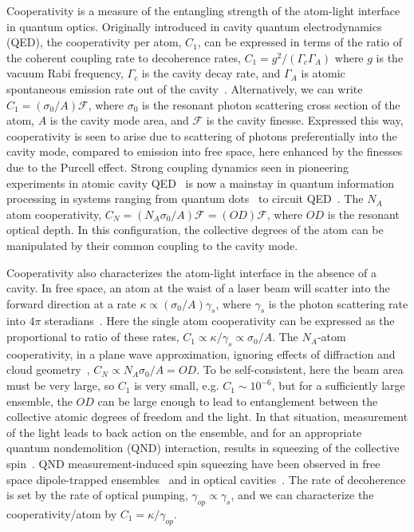 \documentclass[preprint,aps,pra,onecolumn,superscriptaddress]{revtex4-1} %
\begin{document}
Cooperativity is a measure of the entangling strength of the atom-light interface in quantum optics.  Originally introduced in cavity quantum electrodynamics (QED), the cooperativity per atom, $C_1$, can be expressed in terms of the ratio of the coherent coupling rate to decoherence rates, $C_1 = g^2/(\Gamma_c \Gamma_A)$ where $g$ is the vacuum Rabi frequency,  $\Gamma_c$ is the cavity decay rate, and $\Gamma_A$ is atomic spontaneous emission rate out of the cavity~\cite{Kimble1998}.  Alternatively, we can write $C_1 = (\sigma_0/A) \mathcal{F}$, where $\sigma_0$ is the resonant photon scattering cross section of the atom, $A$ is the cavity mode area, and $\mathcal{F}$ is the cavity finesse.  Expressed this way, cooperativity is seen to arise due to scattering of photons preferentially into the cavity mode, compared to emission into free space, here enhanced by the finesses due to the Purcell effect. Strong coupling dynamics seen in pioneering experiments in atomic cavity QED~\cite{Raimond2001Manipulating, Miller2005} is now a mainstay in quantum information processing in systems ranging from quantum dots~\cite{Akimov2007, Akopian2006, Liu2010} to circuit QED~\cite{Wallraff2004Strong, Hofheinz2009Synthesizing}.  The $N_A$ atom cooperativity, $C_N = (N_A \sigma_0/A) \mathcal{F} =( OD) \mathcal{F}$, where $OD$ is the resonant optical depth.  In this configuration, the collective degrees of the atom can be manipulated by their common coupling to the cavity mode.

Cooperativity also characterizes the atom-light interface in the absence of a cavity.  In free space, an atom at the waist of a laser beam will scatter into the forward direction at a rate $\kappa \propto (\sigma_0/A) \gamma_s$, where $\gamma_s$ is the photon scattering rate into $4 \pi$ steradians~\cite{Baragiola2014}.  Here the single atom cooperativity can be expressed as the proportional to ratio of these rates, $C_1 \propto \kappa/\gamma_s \propto \sigma_0/A$.  The $N_A$-atom cooperativity, in a plane wave approximation, ignoring effects of diffraction and cloud geometry~\cite{Baragiola2014}, $C_N \propto N_A \sigma_0/A = OD$.  To be self-consistent, here the beam area must be very large, so $C_1$ is very small, e.g. $C_1 \sim 10^{-6}$, but for a sufficiently large ensemble, the $OD$ can be large enough to lead to entanglement between the collective atomic degrees of freedom and the light.  In that situation, measurement of the light leads to back action on the ensemble, and for an appropriate quantum nondemolition (QND) interaction, results in squeezing of the collective spin~\cite{Kuzmich1998, Takahashi1999Quantum}. QND measurement-induced spin squeezing have been observed in free space dipole-trapped ensembles~\cite{Appel2009Mesoscopic, Takano2009Spin, Sewell2012Magnetic} and in optical cavities~\cite{Schleier-Smith2010States, Cox2016Deterministic, Hosten2016}. The rate of decoherence is set by the rate of optical pumping,  $\gamma_{op} \propto \gamma_s$, and we can characterize the cooperativity/atom by $C_1 = \kappa/\gamma_{op}$.
\end{document}
